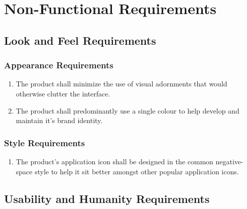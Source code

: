 \documentclass[]{article}
\begin{document}

\section{Non-Functional Requirements}
\label{sec:non-functional_requirements}

\newcommand{\holdEnum}{\setcounter{_enumi}{\value{enumi}}}
\newcommand{\resumeEnum}{\setcounter{enumi}{\value{_enumi}}}

\subsection{Look and Feel Requirements}
\label{sub:look_and_feel_requirements}

\subsubsection{Appearance Requirements}
\label{ssub:appearance_requirements}
\begin{enumerate}[{LF}1. ]
	\item The product shall minimize the use of visual adornments that would otherwise clutter the interface.
	\item The product shall predominantly use a single colour to help develop and maintain it's brand identity.
	\holdEnum
\end{enumerate}

\subsubsection{Style Requirements}
\label{ssub:style_requirements}
\begin{enumerate}[{LF}1.]
	\resumeEnum
	\item The product's application icon shall be designed in the common negative-space style to help it sit better amongst other popular application icons.  
\end{enumerate}


\subsection{Usability and Humanity Requirements}
\label{sub:usability_and_humanity_requirements}
\end{document}

